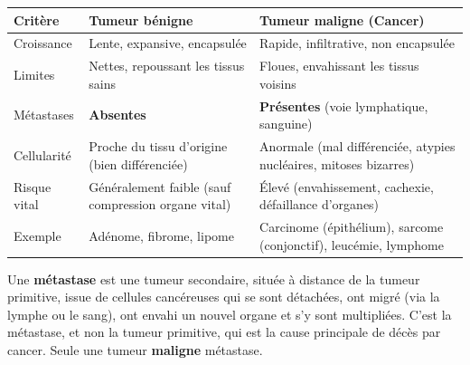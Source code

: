 \documentclass[11pt]{article}
\begin{document}
\begin{center}
\begin{tabularx}{\linewidth}{|l|X|X|}
\hline
\rowcolor{popblueL} \textbf{Critère} & \textbf{Tumeur bénigne} & \textbf{Tumeur maligne (Cancer)} \\
\hline
Croissance & Lente, expansive, encapsulée & Rapide, infiltrative, non encapsulée \\
\hline
Limites & Nettes, repoussant les tissus sains & Floues, envahissant les tissus voisins \\
\hline
Métastases & \textbf{Absentes} & \textbf{Présentes} (voie lymphatique, sanguine) \\
\hline
Cellularité & Proche du tissu d'origine (bien différenciée) & Anormale (mal différenciée, atypies nucléaires, mitoses bizarres) \\
\hline
Risque vital & Généralement faible (sauf compression organe vital) & Élevé (envahissement, cachexie, défaillance d'organes) \\
\hline
Exemple & Adénome, fibrome, lipome & Carcinome (épithélium), sarcome (conjonctif), leucémie, lymphome \\
\hline
\end{tabularx}
\end{center}

\begin{aretenir}
Une \textbf{métastase} est une tumeur secondaire, située à distance de la tumeur primitive, issue de cellules cancéreuses qui se sont détachées, ont migré (via la lymphe ou le sang), ont envahi un nouvel organe et s'y sont multipliées. C'est la métastase, et non la tumeur primitive, qui est la cause principale de décès par cancer. Seule une tumeur \textbf{maligne} métastase.
\end{aretenir}
\end{document}
